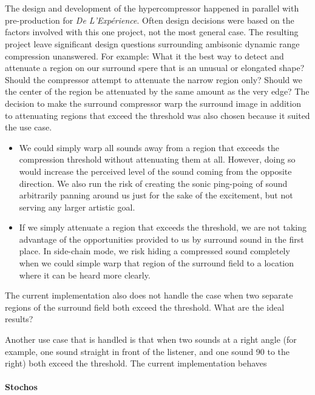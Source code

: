 \section{\thesis}
The design and development of the hypercompressor happened in parallel
with pre-production for \textit{De L'Exp\'{e}rience}. Often design
decisions were based on the factors involved with this one project,
not the most general case. The resulting project leave significant
design questions surrounding ambisonic dynamic range compression
unanswered.  For example: What it the best way to detect and attenuate
a region on our surround spere that is an unusual or elongated shape?
Should the compressor attempt to attenuate the narrow region only?
Should we the center of the region be attenuated by the same amount as
the very edge? The decision to make the surround compressor warp the
surround image in addition to attenuating regions that exceed the
threshold was also chosen because it suited the use case.
\begin{itemize}
\item We could simply warp all sounds away from a region that exceeds
  the compression threshold without attenuating them at all. However,
  doing so would increase the perceived level of the sound coming from
  the opposite direction. We also run the risk of creating the sonic
  ping-poing of sound arbitrarily panning around us just for the sake
  of the excitement, but not serving any larger artistic goal. 
\item If we simply attenuate a region that exceeds the threshold, we
  are not taking advantage of the opportunities provided to us by
  surround sound in the first place. In side-chain mode, we risk
  hiding a compressed sound completely when we could simple warp that
  region of the surround field to a location where it can be heard
  more clearly.
\end{itemize}
The current implementation also does not handle the case when two
separate regions of the surround field both exceed the threshold. What
are the ideal results? 

Another use case that is handled is that
when two sounds at a right angle (for example, one sound straight in
front of the listener, and one sound 90\degree{} to the right) both
exceed the threshold. The current implementation behaves
\paragraph{Stochos}

